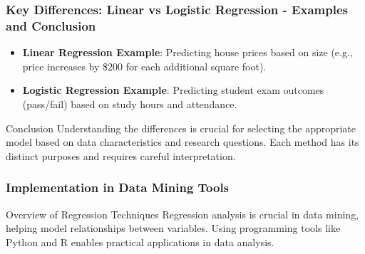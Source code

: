 \documentclass[aspectratio=169]{beamer}
\begin{document}
\begin{frame}[fragile]
    \frametitle{Key Differences: Linear vs Logistic Regression - Examples and Conclusion}
    \begin{itemize}
        \item \textbf{Linear Regression Example}: 
        Predicting house prices based on size (e.g., price increases by \$200 for each additional square foot).
        \item \textbf{Logistic Regression Example}: 
        Predicting student exam outcomes (pass/fail) based on study hours and attendance.
    \end{itemize}
    
    \begin{block}{Conclusion}
        Understanding the differences is crucial for selecting the appropriate model based on data characteristics and research questions. Each method has its distinct purposes and requires careful interpretation.
    \end{block}
\end{frame}

\begin{frame}
    \frametitle{Implementation in Data Mining Tools}
    \begin{block}{Overview of Regression Techniques}
        Regression analysis is crucial in data mining, helping model relationships between variables. Using programming tools like Python and R enables practical applications in data analysis.
    \end{block}
\end{frame}
\end{document}
